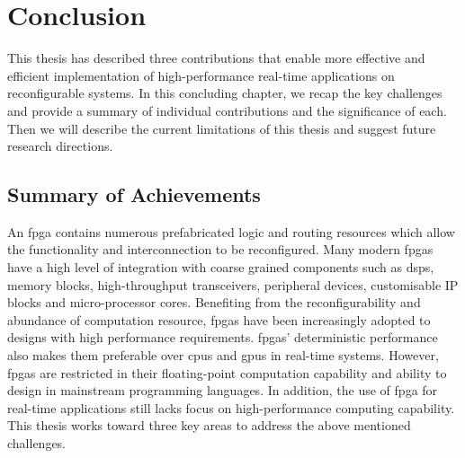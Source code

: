 
\chapter{Conclusion}

\label{ch:conclusion}

This thesis has described three contributions that enable more effective and efficient implementation of high-performance real-time applications on reconfigurable systems.
In this concluding chapter, we recap the key challenges and provide a summary of individual contributions and the significance of each.
Then we will describe the current limitations of this thesis and suggest future research directions.

\section{Summary of Achievements}

An \gls{fpga} contains numerous prefabricated logic and routing resources which allow the functionality and interconnection to be reconfigured.
Many modern \glspl{fpga} have a high level of integration with coarse grained components such as \glspl{dsp}, memory blocks, high-throughput transceivers, peripheral devices, customisable IP blocks and micro-processor cores.
Benefiting from the reconfigurability and abundance of computation resource, \glspl{fpga} have been increasingly adopted to designs with high performance requirements.
\glspl{fpga}' deterministic performance also makes them preferable over \glspl{cpu} and \glspl{gpu} in real-time systems.
However, \glspl{fpga} are restricted in their floating-point computation capability and ability to design in mainstream programming languages.
In addition, the use of \gls{fpga} for real-time applications still lacks focus on high-performance computing capability.
This thesis works toward three key areas to address the above mentioned challenges.

